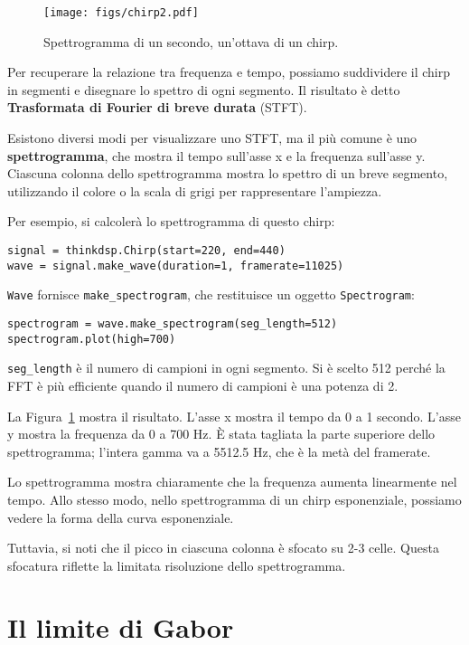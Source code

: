 \documentclass[12pt,a4paper]{book}
\begin{document}
\begin{figure} 

\centerline{\texttt{[image: figs/chirp2.pdf]}} \caption{Spettrogramma di un secondo, un'ottava di un chirp.} \label{fig.chirp2} \end{figure} 

Per recuperare la relazione tra frequenza e tempo, possiamo suddividere il chirp in segmenti e disegnare lo spettro di ogni segmento. Il risultato è detto {\bf Trasformata di Fourier di breve durata} (STFT).

Esistono diversi modi per visualizzare uno STFT, ma il più comune è uno {\bf spettrogramma}, che mostra il tempo sull'asse x e la frequenza sull'asse y. Ciascuna colonna dello spettrogramma mostra lo spettro di un breve segmento, utilizzando il colore o la scala di grigi per rappresentare l'ampiezza.

Per esempio, si calcolerà lo spettrogramma di questo chirp:

\begin{verbatim} 
signal = thinkdsp.Chirp(start=220, end=440)
wave = signal.make_wave(duration=1, framerate=11025)
 \end{verbatim} 

{\tt Wave} fornisce \verb"make_spectrogram", che restituisce un oggetto {\tt Spectrogram}:

\begin{verbatim} 
spectrogram = wave.make_spectrogram(seg_length=512)
spectrogram.plot(high=700)
 \end{verbatim} 

\verb"seg_length" è il numero di campioni in ogni segmento. Si è scelto 512 perché la FFT è più efficiente quando il numero di campioni è una potenza di 2.

La Figura~\ref{fig.chirp2} mostra il risultato. L'asse x mostra il tempo da 0 a 1 secondo. L'asse y mostra la frequenza da 0 a 700 Hz. È stata tagliata la parte superiore dello spettrogramma; l'intera gamma va a 5512.5 Hz, che è la metà del framerate.

Lo spettrogramma mostra chiaramente che la frequenza aumenta linearmente nel tempo. Allo stesso modo, nello spettrogramma di un chirp esponenziale, possiamo vedere la forma della curva esponenziale.

Tuttavia, si noti che il picco in ciascuna colonna è sfocato su 2-3 celle. Questa sfocatura riflette la limitata risoluzione dello spettrogramma.

\section{Il limite di Gabor} \label{gabor} 
\end{document}
